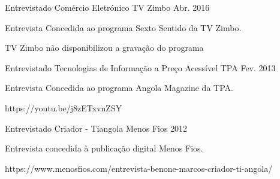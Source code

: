 


\begin{cventries}


\cventry
{Entrevistado} %
{Comércio Eletrónico} %
{TV Zimbo} %
{Abr. 2016} %
{ %
\begin{cvitems}
\item {Entrevista Concedida ao programa Sexto Sentido da TV Zimbo.}
\item {TV Zimbo não disponibilizou a gravação do programa}
\end{cvitems}
}


\cventry
{Entrevistado} %
{Tecnologias de Informação a Preço Acessível} %
{TPA} %
{Fev. 2013} %
{ %
\begin{cvitems}
\item {Entrevista Concedida ao programa Angola Magazine da TPA.}
\item {https://youtu.be/j8zETxvnZSY}
\end{cvitems}
}


\cventry
{Entrevistado} %
{Criador - Tiangola} %
{Menos Fios} %
{2012} %
{ %
\begin{cvitems}
\item {Entrevista concedida à publicação digital Menos Fios.}
\item {https://www.menosfios.com/entrevista-benone-marcos-criador-ti-angola/}
\end{cvitems}
}


\end{cventries}

